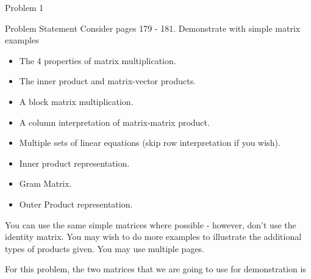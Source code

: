 \begin{problem}{Problem 1}
    \begin{statement}{Problem Statement}
        Consider pages 179 - 181.  Demonstrate with simple matrix examples

        \begin{itemize}
            \item The 4 properties of matrix multiplication.
            \item The inner product and matrix-vector products.
            \item A block matrix multiplication.
            \item A column interpretation of matrix-matrix product.
            \item Multiple sets of linear equations (skip row interpretation if you wish).
            \item Inner product representation.
            \item Gram Matrix.
            \item Outer Product representation.
        \end{itemize}

        You can use the same simple matrices where possible - however, don't use the identity matrix. You may wish to do more examples to illustrate the additional types of products given. You may use 
        multiple pages.
    \end{statement}

    \begin{Highlight}[Solution]
        For this problem, the two matrices that we are going to use for demonstration is


\end{Highlight}
\end{problem}
